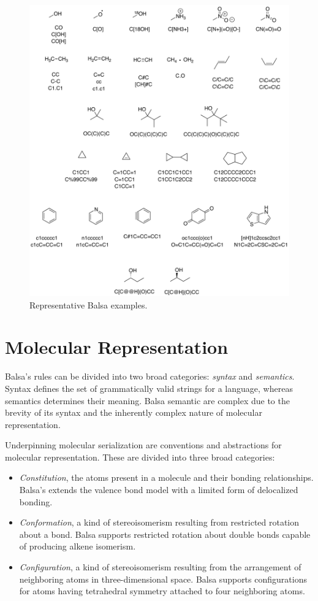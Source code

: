 \documentclass{article}
\begin{document}
\begin{figure}
\centering
\includegraphics[width=\columnwidth]{representative-examples.pdf}
\caption{Representative Balsa examples.}
\label{fig:representative-examples}
\end{figure}

\section*{Molecular Representation}
\label{molecular-representation}

Balsa's rules can be divided into two broad categories: \textit{syntax} and \textit{semantics}. Syntax defines the set of grammatically valid strings for a language, whereas semantics determines their meaning. Balsa semantic are complex due to the brevity of its syntax and the inherently complex nature of molecular representation.

Underpinning molecular serialization are conventions and abstractions for molecular representation. These are divided into three broad categories:

\begin{itemize}
\item \textit{Constitution}, the atoms present in a molecule and their bonding relationships. Balsa's extends the valence bond model with a limited form of delocalized bonding.
\item \textit{Conformation}, a kind of stereoisomerism resulting from restricted rotation about a bond. Balsa supports restricted rotation about double bonds capable of producing alkene isomerism.
\item \textit{Configuration}, a kind of stereoisomerism resulting from the arrangement of neighboring atoms in three-dimensional space. Balsa supports configurations for atoms having tetrahedral symmetry attached to four neighboring atoms.
\end{itemize}
\end{document}
